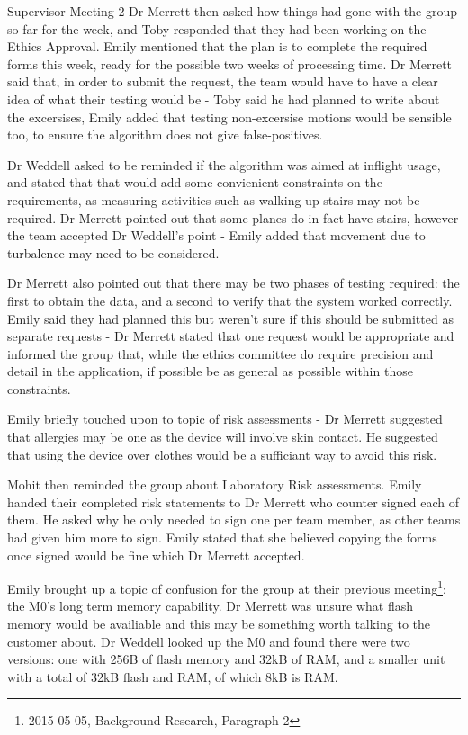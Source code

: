 \documentclass{article}
\begin{document}
\begin{Minutes}{Supervisor Meeting 2}
Dr Merrett then asked how things had gone with the group so far for the week, and Toby responded
that they had been working on the Ethics Approval. Emily mentioned that the plan is to complete
the required forms this week, ready for the possible two weeks of processing time. Dr Merrett
said that, in order to submit the request, the team would have to have a clear idea of what their
testing would be - Toby said he had planned to write about the excersises, Emily added that testing
non-excersise motions would be sensible too, to ensure the algorithm does not give false-positives.

Dr Weddell asked to be reminded if the algorithm was aimed at inflight usage, and stated that that
would add some convienient constraints on the requirements, as measuring activities such as walking
up stairs may not be required. Dr Merrett pointed out that some planes do in fact have stairs,
however the team accepted Dr Weddell's point - Emily added that movement due to turbalence may
need to be considered.

Dr Merrett also pointed out that there may be two phases of testing required: the first to obtain
the data, and a second to verify that the system worked correctly. Emily said they had planned this
but weren't sure if this should be submitted as separate requests - Dr Merrett stated that one
request would be appropriate and informed the group that, while the ethics committee do require
precision and detail in the application, if possible be as general as possible within those
constraints.

Emily briefly touched upon to topic of risk assessments - Dr Merrett suggested that allergies may
be one as the device will involve skin contact. He suggested that using the device over clothes
would be a sufficiant way to avoid this risk.

Mohit then reminded the group about Laboratory Risk assessments. Emily handed their completed
risk statements to Dr Merrett who counter signed each of them. He asked why he only needed to sign
one per team member, as other teams had given him more to sign. Emily stated that she believed
copying the forms once signed would be fine which Dr Merrett accepted.


Emily brought up a topic of confusion for the group at their previous meeting\footnote
{2015-05-05, Background Research, Paragraph 2}: the M0's long term memory capability.
Dr Merrett was unsure what flash memory would be availiable and this may be something worth
talking to the customer about. Dr Weddell looked up the M0 and found there were two versions:
one with 256B of flash memory and 32kB of RAM, and a smaller unit with a total of 32kB flash
and RAM, of which 8kB is RAM.


\end{Minutes}
\end{document}
